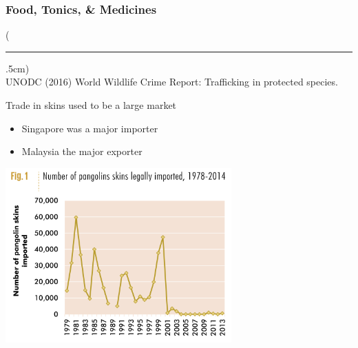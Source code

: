\documentclass[10pt]{beamer}
\newenvironment{reference}[2]{%
	\begin{textblock*}{\textwidth}(#1,#2)
		\tiny\bgroup\color{gray}}{\egroup\end{textblock*}}
\begin{document}
\begin{frame}[t]
\frametitle{Food, Tonics, \& Medicines}
\vspace{0.5cm}
	
	\begin{reference}{4mm}{92mm}
		\rule{1.5cm}{0.25pt}\\
		UNODC (2016) World Wildlife Crime Report: Trafficking in protected species.
	\end{reference}
	
	Trade in skins used to be a large market
	\smallskip
		\begin{itemize}
			\item Singapore was a major importer
			\smallskip
			\item Malaysia the major exporter
		\end{itemize}

	\vspace{0.25cm}
	
	\begin{center}
		\includegraphics[width=0.65\textwidth]{figures/pangolin_skins.png}
	\end{center}
\end{frame}
\end{document}
